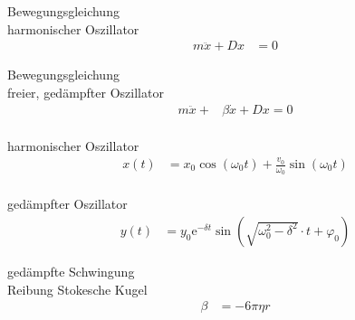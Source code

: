 %


\begin{karte}{Bewegungsgleichung \\ harmonischer Oszillator}
    \begin{align*}
        m \ddot x + Dx &= 0
    \end{align*}
\end{karte}

\begin{karte}{Bewegungsgleichung \\ freier, gedämpfter Oszillator}
    \begin{align*}
        m \ddot x + &\beta \dot x + Dx = 0 \\
    \end{align*}
\end{karte}

\begin{karte}{harmonischer Oszillator}
    \begin{align*}
        x(t) &= x_0 \cos \left( \omega_0 t \right) + \frac{v_0}{\omega_0} \sin \left( \omega_0 t \right) \\
    \end{align*}
\end{karte}

\begin{karte}{gedämpfter Oszillator}
    \begin{align*}
        y(t) &= y_0 \mathrm e^{-\delta t} \sin \left( \sqrt{  \omega_0^2 - \delta^2 } \cdot t + \varphi_0 \right)
    \end{align*}
\end{karte}

\begin{karte}{gedämpfte Schwingung \\ Reibung Stokesche Kugel}
    \begin{align*}
        \beta &=  -6 \pi \eta r
    \end{align*}
\end{karte}


